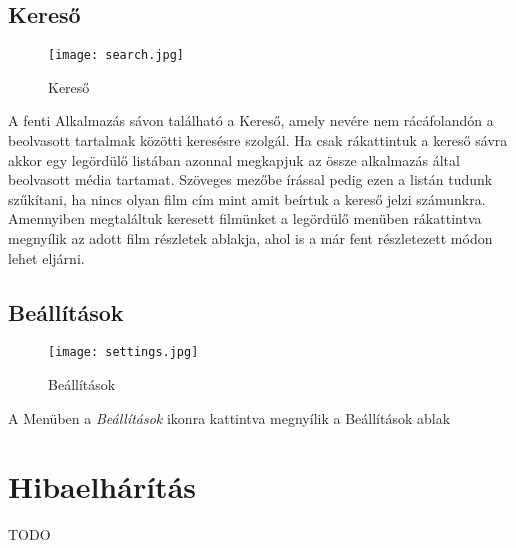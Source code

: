 \cleardoublepage
\subsection{Kereső}
\begin{figure}[H]
	\centering
	\texttt{[image: search.jpg]}
	\caption{Kereső}
	\label{fig:search}
\end{figure}
A fenti Alkalmazás sávon található a Kereső, amely nevére nem rácáfolandón a beolvasott tartalmak közötti keresésre szolgál. Ha csak rákattintuk a kereső sávra akkor egy legördülő listában azonnal megkapjuk az össze alkalmazás által beolvasott média tartamat. Szöveges mezőbe írással pedig ezen a listán tudunk szűkítani, ha nincs olyan film cím mint amit beírtuk a kereső jelzi számunkra. Amennyiben megtaláltuk keresett filmünket a legördülő menüben rákattintva megnyílik az adott film részletek ablakja, ahol is a már fent részletezett módon lehet eljárni.

\cleardoublepage
\subsection{Beállítások}
\begin{figure}[H]
	\centering
	\texttt{[image: settings.jpg]}
	\caption{Beállítások}
	\label{fig:settings}
\end{figure}
A Menüben a {\it Beállítások} ikonra kattintva megnyílik a Beállítások ablak

\section{Hibaelhárítás}
TODO
